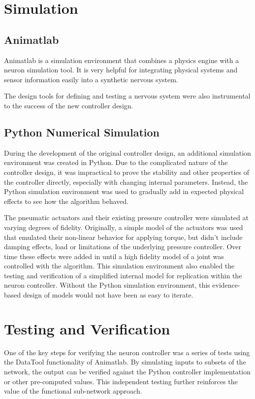 \section{Simulation}

\subsection{Animatlab}

Animatlab is a simulation environment that combines a physics engine with a
neuron simulation tool. It is very helpful for integrating physical systems
and sensor information easily into a synthetic nervous system.

The design tools for defining and testing a nervous system were also instrumental
to the success of the new controller design.

\subsection{Python Numerical Simulation}

During the development of the original controller design, an additional
simulation environment was created in Python. Due to the complicated nature of
the controller design, it was impractical to prove the stability and other
properties of the controller directly, especially with changing internal
parameters. Instead, the Python simulation environment was used to gradually add
in expected physical effects to see how the algorithm behaved.

The pneumatic actuators and their existing pressure controller were simulated 
at varying degrees of fidelity. Originally, a simple model of the actuators
was used that emulated their non-linear behavior for applying torque, but didn't
include damping effects, load or limitations of the underlying pressure
controller. Over time these effects were added in until a high fidelity model of
a joint was controlled with the algorithm. This simulation environment also
enabled the testing and verification of a simplified internal model for
replication within the neuron controller. Without the Python simulation
environment, this evidence-based design of models would not have been as easy to
iterate.

\section{Testing and Verification}

One of the key steps for verifying the neuron controller was a series of tests
using the DataTool functionality of Animatlab. By simulating inputs to subsets
of the network, the output can be verified against the Python controller
implementation or other pre-computed values. This independent testing further
reinforces the value of the functional sub-network approach.

